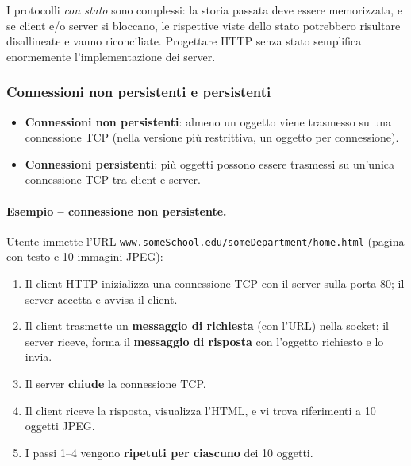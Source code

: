 \documentclass[12pt, a4paper]{article}
\begin{document}
\begin{tcolorbox}[colback=lightergray!10, colframe=tocsec, title=\textbf{Nota -- perché evitare lo stato?}]
I protocolli \textit{con stato} sono complessi: la storia passata deve essere memorizzata, e se client e/o server si bloccano, le rispettive viste dello stato potrebbero risultare disallineate e vanno riconciliate. Progettare HTTP senza stato semplifica enormemente l'implementazione dei server.
\end{tcolorbox}

\subsubsection{Connessioni non persistenti e persistenti}

\begin{itemize}
    \item \textbf{Connessioni non persistenti}: almeno un oggetto viene trasmesso su una connessione TCP (nella versione più restrittiva, un oggetto per connessione).
    \item \textbf{Connessioni persistenti}: più oggetti possono essere trasmessi su un'unica connessione TCP tra client e server.
\end{itemize}

\paragraph{Esempio -- connessione non persistente.} Utente immette l'URL \texttt{www.someSchool.edu/someDepartment/home.html} (pagina con testo e 10 immagini JPEG):
\begin{enumerate}
    \item Il client HTTP inizializza una connessione TCP con il server sulla porta 80; il server accetta e avvisa il client.
    \item Il client trasmette un \textbf{messaggio di richiesta} (con l'URL) nella socket; il server riceve, forma il \textbf{messaggio di risposta} con l'oggetto richiesto e lo invia.
    \item Il server \textbf{chiude} la connessione TCP.
    \item Il client riceve la risposta, visualizza l'HTML, e vi trova riferimenti a 10 oggetti JPEG.
    \item I passi 1--4 vengono \textbf{ripetuti per ciascuno} dei 10 oggetti.
\end{enumerate}
\end{document}
